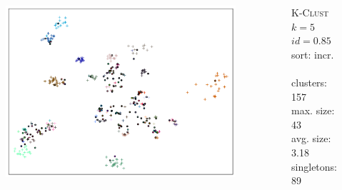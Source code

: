 \documentclass{beamer}
\begin{document}
\begin{frame}
  \begin{columns}[c]
    \begin{figure}[h]
      \includegraphics[width=0.95\textwidth]{graphics/MDS_Silva_incr.pdf}
    \end{figure}

    \textsc{K-Clust} \\
    $k = 5$ \\
    $id = 0.85$ \\
    sort: incr. \\
    \hfill \\
    clusters: 157 \\
    max. size: 43 \\
    avg. size: 3.18 \\
    singletons: 89
  \end{columns}
\end{frame}
\end{document}
